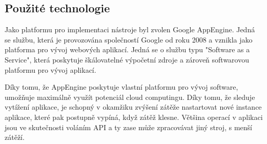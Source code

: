 \documentclass[bc,male,java,dept456]{diploma}						%
\begin{document}

\clearpage

\subsection{Použité technologie}

Jako platformu pro implementaci nástroje byl zvolen Google AppEngine. Jedná se službu, která je provozována společností Google od roku 2008 a vznikla jako platforma pro vývoj webových aplikací. Jedná se o službu typu "Software as a Service", která poskytuje šká\-lo\-va\-tel\-né výpočetní zdroje a zároveň softwarovou platformu pro vývoj aplikací.

Díky tomu, že AppEngine poskytuje vlastní platformu pro vývoj software, umožňuje maximálně využít potenciál cloud computingu. Díky tomu, že sleduje vytížení aplikace, je schopný v okamžiku zvýšení zátěže nastartovat nové instance aplikace, které pak postupně vypíná, když zátěž klesne. Většina operací v aplikaci jsou ve skutečnosti voláním API a ty zase může zpracovávat jiný stroj, s menší zátěží. 
\end{document}

